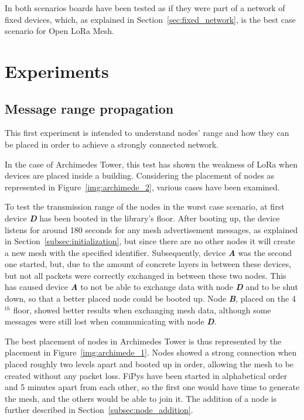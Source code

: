 		In both scenarios boards have been tested as if they were part of a network of fixed devices, which, as explained in Section~\ref{sec:fixed_network}, is the best case scenario for Open LoRa Mesh.
	
	\section{Experiments}
		
		\subsection{Message range propagation}
		
			This first experiment is intended to understand nodes' range and how they can be placed in order to achieve a strongly connected network.
			
			In the case of Archimedes Tower, this test has shown the weakness of LoRa when devices are placed inside a building.
			Considering the placement of nodes as represented in Figure~\ref{img:archimede_2}, various cases have been examined.
			
			To test the transmission range of the nodes in the worst case scenario, at first device \textbf{\textit{D}} has been booted in the library's floor.
			After booting up, the device listens for around 180 seconds for any mesh advertisement messages, as explained in Section~\ref{subsec:initialization}, but since there are no other nodes it will create a new mesh with the specified identifier.
			Subsequently, device \textbf{\textit{A}} was the second one started, but, due to the amount of concrete layers in between these devices, but not all packets were correctly exchanged in between these two nodes.
			This has caused device \textbf{\textit{A}} to not be able to exchange data with node \textbf{\textit{D}} and to be shut down, so that a better placed node could be booted up.
			Node \textbf{\textit{B}}, placed on the 4$^{th}$ floor, showed better results when exchanging mesh data, although some messages were still lost when communicating with node \textbf{\textit{D}}.
			
			The best placement of nodes in Archimedes Tower is thus represented by the placement in Figure~\ref{img:archimede_1}.
			Nodes showed a strong connection when placed roughly two levels apart and booted up in order, allowing the mesh to be created without any packet loss.
			FiPys have been started in alphabetical order and 5 minutes apart from each other, so the first one would have time to generate the mesh, and the others would be able to join it.
			The addition of a node is further described in Section~\ref{subsec:node_addition}.
			

